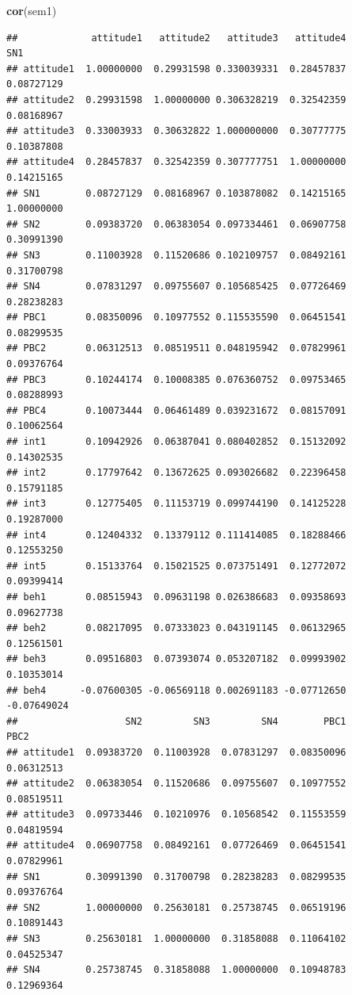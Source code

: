 \documentclass[
]{article}
\newenvironment{Shaded}{\begin{snugshade}}{\end{snugshade}}
\newcommand{\FunctionTok}[1]{\textcolor[rgb]{0.13,0.29,0.53}{\textbf{#1}}}
\newcommand{\NormalTok}[1]{#1}
\begin{document}
\begin{Shaded}
\begin{Highlighting}[]
\FunctionTok{cor}\NormalTok{(sem1)}
\end{Highlighting}
\end{Shaded}

\begin{verbatim}
##             attitude1   attitude2   attitude3   attitude4         SN1
## attitude1  1.00000000  0.29931598 0.330039331  0.28457837  0.08727129
## attitude2  0.29931598  1.00000000 0.306328219  0.32542359  0.08168967
## attitude3  0.33003933  0.30632822 1.000000000  0.30777775  0.10387808
## attitude4  0.28457837  0.32542359 0.307777751  1.00000000  0.14215165
## SN1        0.08727129  0.08168967 0.103878082  0.14215165  1.00000000
## SN2        0.09383720  0.06383054 0.097334461  0.06907758  0.30991390
## SN3        0.11003928  0.11520686 0.102109757  0.08492161  0.31700798
## SN4        0.07831297  0.09755607 0.105685425  0.07726469  0.28238283
## PBC1       0.08350096  0.10977552 0.115535590  0.06451541  0.08299535
## PBC2       0.06312513  0.08519511 0.048195942  0.07829961  0.09376764
## PBC3       0.10244174  0.10008385 0.076360752  0.09753465  0.08288993
## PBC4       0.10073444  0.06461489 0.039231672  0.08157091  0.10062564
## int1       0.10942926  0.06387041 0.080402852  0.15132092  0.14302535
## int2       0.17797642  0.13672625 0.093026682  0.22396458  0.15791185
## int3       0.12775405  0.11153719 0.099744190  0.14125228  0.19287000
## int4       0.12404332  0.13379112 0.111414085  0.18288466  0.12553250
## int5       0.15133764  0.15021525 0.073751491  0.12772072  0.09399414
## beh1       0.08515943  0.09631198 0.026386683  0.09358693  0.09627738
## beh2       0.08217095  0.07333023 0.043191145  0.06132965  0.12561501
## beh3       0.09516803  0.07393074 0.053207182  0.09993902  0.10353014
## beh4      -0.07600305 -0.06569118 0.002691183 -0.07712650 -0.07649024
##                   SN2         SN3         SN4        PBC1        PBC2
## attitude1  0.09383720  0.11003928  0.07831297  0.08350096  0.06312513
## attitude2  0.06383054  0.11520686  0.09755607  0.10977552  0.08519511
## attitude3  0.09733446  0.10210976  0.10568542  0.11553559  0.04819594
## attitude4  0.06907758  0.08492161  0.07726469  0.06451541  0.07829961
## SN1        0.30991390  0.31700798  0.28238283  0.08299535  0.09376764
## SN2        1.00000000  0.25630181  0.25738745  0.06519196  0.10891443
## SN3        0.25630181  1.00000000  0.31858088  0.11064102  0.04525347
## SN4        0.25738745  0.31858088  1.00000000  0.10948783  0.12969364

\end{verbatim}
\end{document}
